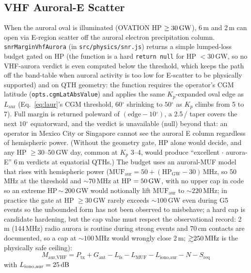 \documentclass[11pt,a4paper]{article}
\newcommand{\SI}[2]{#1\,\text{#2}}
\newcommand{\si}[1]{\text{#1}}
\newcommand{\dB}{\text{dB}}
\newcommand{\MHz}{\text{MHz}}
\newcommand{\GW}{\text{GW}}
\newcommand{\degree}{\ensuremath{{}^\circ}}
\begin{document}
\subsection{VHF Auroral-E Scatter}\label{sec:vhfaur}

When the auroral oval is illuminated (OVATION
HP $\ge \SI{30}{\GW}$), 6\,m and 2\,m can open via E-region
scatter off the auroral electron precipitation column.
\texttt{snrMarginVhfAurora} (in \texttt{src/physics/snr.js})
returns a simple lumped-loss budget gated on HP (the
function is a hard \texttt{return null} for HP $< 30$\,GW, so
no VHF-aurora verdict is even computed below the threshold,
which keeps the path off the band-table when auroral activity
is too low for E-scatter to be physically supported) and on
QTH geometry: the function requires the operator's CGM latitude
(\texttt{opts.cgmLatAbsValue}) and applies the same
$K_p$-expanded oval edge as $L_{\text{aur}}$
(Eq.~\ref{eq:laur}'s CGM threshold, $60\degree$ shrinking to
$50\degree$ as $K_p$ climbs from 5 to 7).  Full margin is
returned poleward of $(\text{edge} - 10\degree)$, a
\SI{2.5}{\dB}/\si{\degree} taper covers the next $10\degree$
equatorward, and the verdict is unavailable (null) beyond that:
an operator in Mexico City or Singapore cannot see the
auroral E column regardless of hemispheric power.  (Without
the geometry gate, HP alone would decide, and any HP $\ge 30$--50\,GW
day, common at $K_p$ 3--4, would produce ``excellent
$\cdot$ aurora-E'' 6\,m verdicts at equatorial QTHs.)  The
budget uses an
auroral-MUF model that rises with hemispheric power
($\text{MUF}_{\text{aur}} = 50 + (\text{HP}_{\text{GW}} - 30)$\,MHz,
so 50\,MHz at the threshold and ${\sim}\!70$\,MHz at
HP $= \SI{50}{\GW}$, with no upper cap in code so an extreme
HP\,${\sim}\,200$\,GW would notionally lift $\text{MUF}_{\text{aur}}$
to $\sim 220$\,MHz; in practice the gate at HP $\ge 30$\,GW
rarely exceeds $\sim 100$\,GW even during G5 events so the
unbounded form has not been observed to misbehave; a hard cap is
candidate hardening, but the cap value must respect the
observational record: 2\,m (144\,MHz) radio aurora is routine
during strong events and 70\,cm contacts are documented, so a cap
at $\sim 100$\,MHz would wrongly close 2\,m;
${\gtrsim}\SI{250}{\MHz}$ is the physically safe ceiling):
\begin{equation}\label{eq:vhfaurmargin}
  M_{\text{aur,VHF}} = P_{\text{tx}} + G_{\text{ant}}
    - L_{\text{fs}} - L_{\text{MUF}}
    - L_{\text{iono,aur}} - N - S_{\text{req}}
\end{equation}
with $L_{\text{iono,aur}} = \SI{25}{\dB}$
\end{document}
